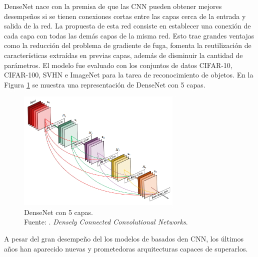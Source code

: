 DenseNet nace con la premisa de que las CNN pueden obtener mejores desempeños si se tienen conexiones cortas entre las capas cerca de la entrada y salida de la red. La propuesta de esta red consiste en establecer una conexión de cada capa con todas las demás capas de la misma red. Esto trae grandes ventajas como la reducción del problema de gradiente de fuga, fomenta la reutilización de características extraídas en previas capas, además de disminuir la cantidad de parámetros. El modelo fue evaluado con los conjuntos de datos CIFAR-10, CIFAR-100, SVHN e ImageNet para la tarea de reconocimiento de objetos. \parencite{pr_huang2016densconn} En la Figura \ref{2:fig205} se muestra una representación de DenseNet con 5 capas.

\begin{figure}[H]
	\begin{center}
		\includegraphics[width=0.70\textwidth]{2/figures/densenet_5lay.png}
		\caption[DenseNet con 5 capas]{DenseNet con 5 capas. \\
		Fuente: \cite{pr_huang2016densconn}. \textit{Densely Connected Convolutional Networks}.}
		\label{2:fig205}
	\end{center}
\end{figure}


A pesar del gran desempeño del los modelos de basados den CNN, los últimos años han aparecido nuevas y prometedoras arquitecturas capaces de superarlos.

